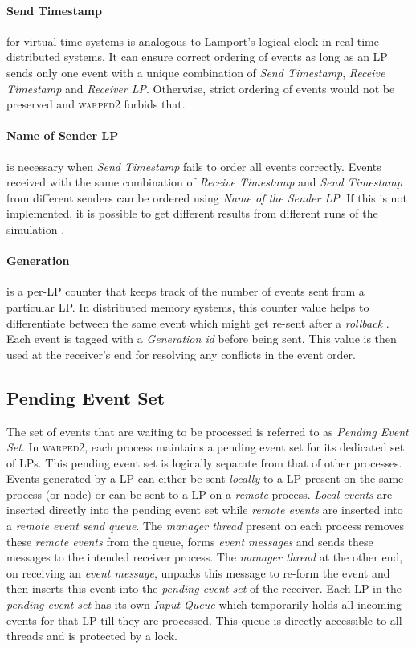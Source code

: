 \documentclass[11pt]{book}
\begin{document}
\paragraph{Send Timestamp} for virtual time systems is analogous to Lamport's logical clock
\cite{lamport-78} in real time distributed systems.  It can ensure correct ordering of events as long as an LP
sends only one event with a unique combination of \emph{Send Timestamp}, \emph{Receive Timestamp} and
\emph{Receiver LP}.  Otherwise, strict ordering of events would not be preserved and \textsc{warped2} forbids
that.

\paragraph{Name of Sender LP} is necessary when \emph{Send Timestamp} fails to order all
events correctly.  Events received with the same combination of \emph{Receive Timestamp} and \emph{Send
  Timestamp} from different senders can be ordered using \emph{Name of the Sender LP}.  If this is not
implemented, it is possible to get different results from different runs of the simulation \cite{ronngren-99}.

\paragraph{Generation} is a per-LP counter that keeps track of the number of events sent
from a particular LP\@.  In distributed memory systems, this counter value helps to differentiate between the
same event which might get re-sent after a \emph{rollback} \cite{ronngren-99}.  Each event is tagged with a
\emph{Generation id} before being sent.  This value is then used at the receiver's end for resolving any
conflicts in the event order.

\subsection{Pending Event Set}\label{subsec:pending_event_set}

The set of events that are waiting to be processed is referred to as \emph{Pending Event Set}.  In
\textsc{warped2}, each process maintains a pending event set for its dedicated set of LPs.  This pending event
set is logically separate from that of other processes.  Events generated by a LP can either be sent
\emph{locally} to a LP present on the same process (or node) or can be sent to a LP on a \emph{remote}
process. \emph{Local events} are inserted directly into the pending event set while \emph{remote events} are
inserted into a \emph{remote event send queue}.  The \emph{manager thread} present on each process removes
these \emph{remote events} from the queue, forms \emph{event messages} and sends these messages to the
intended receiver process.  The \emph{manager thread} at the other end, on receiving an \emph{event message},
unpacks this message to re-form the event and then inserts this event into the \emph{pending event set} of the
receiver.  Each LP in the \emph{pending event set} has its own \emph{Input Queue} which temporarily holds all
incoming events for that LP till they are processed.  This queue is directly accessible to all threads and is
protected by a lock.
\end{document}
